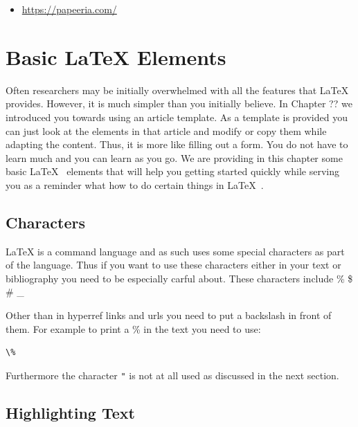 \begin{itemize}

\item
  \url{https://papeeria.com/}
\end{itemize}


\section{Basic LaTeX Elements}\label{latex}

Often researchers may be initially overwhelmed with all the features
that \LaTeX~ provides. However, it is much simpler than you initially
believe. In Chapter ?? we introduced you towards using an article
template. As a template is provided you can just look at the elements
in that article and modify or copy them while adapting the
content. Thus, it is more like filling out a form. You do not have to
learn much and you can learn as you go. We are providing in this
chapter some basic \LaTeX~ elements that will help you getting started
quickly while serving you as a reminder what how to do certain things
in \LaTeX~.



\subsection{Characters}\label{characters}

LaTeX is a command language and as such uses some special characters as
part of the language. Thus if you want to use these characters either in
your text or bibliography you need to be especially carful about. These
characters include \% \$ \# \_

Other than in hyperref links and urls you need to put a backslash in
front of them. For example to print a \% in the text you need to use:

\begin{verbatim}
\%
\end{verbatim}

Furthermore the character \verb|"| is not at all used as discussed in the next
section.

\subsection{Highlighting Text}\label{highlighting-text}

